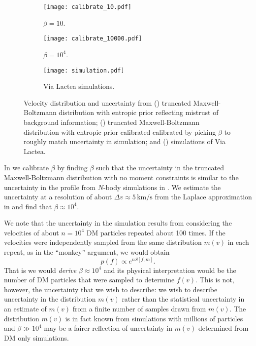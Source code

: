 \documentclass{article}
\begin{document}
\begin{figure}
    \centering
    \begin{subfigure}[t]{0.31\textwidth}
        \centering
        \texttt{[image: calibrate\_10.pdf]}
        \caption{$\beta = 10$.}
        \label{fig:mistrust}
    \end{subfigure}
    \begin{subfigure}[t]{0.31\textwidth}
        \centering
        \texttt{[image: calibrate\_10000.pdf]}
        \caption{$\beta = 10^4$.}
        \label{fig:calibrated}
    \end{subfigure}  
    \begin{subfigure}[t]{0.31\textwidth}
        \centering
        \texttt{[image: simulation.pdf]}
        \caption{Via Lactea simulations\cite{Kuhlen:2009vh}.}
        \label{fig:simulated}
    \end{subfigure}
    \caption{Velocity distribution and uncertainty from () truncated Maxwell-Boltzmann distribution with entropic prior reflecting mistrust of background information; () truncated Maxwell-Boltzmann distribution with entropic prior calibrated calibrated by picking $\beta$ to roughly match uncertainty in simulation; and () simulations of Via Lactea\cite{Kuhlen:2009vh}.}
    \label{fig:calibrate}
\end{figure}

In  we calibrate $\beta$ by finding $\beta$ such that the uncertainty in the truncated Maxwell-Boltzmann distribution with no moment constraints is similar to the uncertainty in the profile from $N$-body simulations in . We estimate the uncertainty at a resolution of about $\Delta v \approx 5\,\text{km/s}$ from the Laplace approximation in  and find that $\beta \approx 10^4$.

We note that the uncertainty in the simulation results from considering the velocities of about $n = 10^4$ DM particles repeated about 100 times. If the velocities were independently sampled from the same distribution $m(v)$ in each repeat, as in the ``monkey'' argument, we would obtain
\begin{equation}
p(f) \propto e^{n S[f, m]}.
\end{equation}
That is we would \emph{derive} $\beta \approx 10^4$ and its physical interpretation would be the number of DM particles that were sampled to determine $f(v)$. This is not, however, the uncertainty that we wish to describe: we wish to describe uncertainty in the distribution $m(v)$ rather than the statistical uncertainty in an estimate of $m(v)$ from a finite number of samples drawn from $m(v)$. The distribution $m(v)$ is in fact known from simulations with millions of particles and $\beta \gg 10^4$ may be a fairer reflection of uncertainty in $m(v)$ determined from DM only simulations. 
\end{document}
